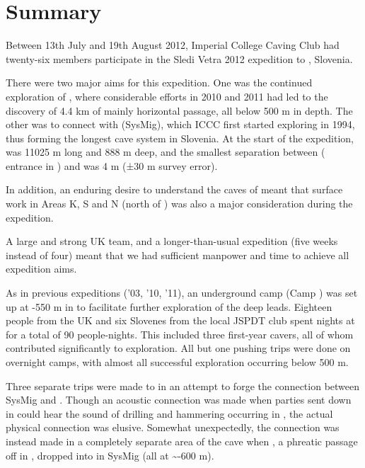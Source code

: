 \section{Summary}

Between 13th July and 19th August 2012, Imperial College Caving Club had
twenty-six members participate in the Sledi Vetra
 2012 expedition to ,
Slovenia.

There were two major aims for this expedition. One was the continued
exploration of , where considerable efforts in 2010 and
2011 had led to the discovery of 4.4 km of mainly horizontal passage,
all below 500 m in depth. The other was to connect  with
 (SysMig), which ICCC first started exploring in 1994,
thus forming the longest cave system in Slovenia. At the start of the
expedition,  was 11025 m long and 888 m deep, and the
smallest separation between  ( entrance in
) and  was 4 m (±30 m survey error).

In addition, an enduring desire to understand the caves of  meant
that surface work in Areas K, S and N (north of ) was also a major
consideration during the expedition.

A large and strong UK team, and a longer-than-usual expedition (five
weeks instead of four) meant that we had sufficient manpower and time to
achieve all expedition aims.

As in previous expeditions ('03, '10, '11), an underground camp (Camp
) was set up at -550 m in  to facilitate
further exploration of the deep leads. Eighteen people from the UK and
six Slovenes from the local JSPDT club spent nights at  for
a total of 90 people-nights. This included three first-year cavers, all
of whom contributed significantly to exploration. All but one pushing
trips were done on overnight camps, with almost all successful
exploration occurring below 500 m.

Three separate trips were made to  in an attempt to
forge the connection between SysMig and . Though an
acoustic connection was made when parties sent down  in
 could hear the sound of drilling and hammering
occurring in , the actual physical connection was
elusive. Somewhat unexpectedly, the connection was instead made in a
completely separate area of the cave when , a
phreatic passage off  in ,
dropped into  in SysMig (all at \textasciitilde -600 m).

